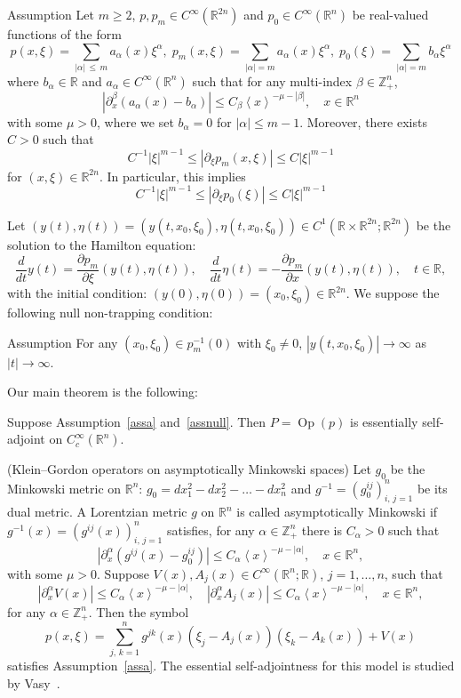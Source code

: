 \documentclass[AHL,Unicode,longabstracts,published]{cedram}
\renewcommand*\a{\alpha}
\renewcommand*\b{\beta}
\newcommand*\m{\mu}
\newcommand*\x{\xi}
\newcommand*\y{\eta}
\DeclareMathOperator{\Op}{Op}
\newcommand*\re{\mathbb{R}}
\newcommand*\ze{\mathbb{Z}}
\newcommand*\pa{\partial}
\newcommand{\jap}[1]{\left\langle #1 \right\rangle}
\begin{document}
\begin{enonce}[plain]{Assumption}\label{assa}
Let $m\geq 2$, $p, p_m\in C^{\infty}(\re^{2n})$ and $p_0\in C^{\infty}(\re^n)$ be real-valued functions of the form
\[
p(x,\x)=\sum_{|\a|\,\leq\,m}a_{\a}(x)\x^{\a},\; p_m(x,\x)=\sum_{|\a|=m}a_{\a}(x)\x^{\a},\; p_0(\x)=\sum_{|\a|=m}b_{\a}\x^{\a}
\]
where $b_{\a}\in \re$ and $a_{\a}\in C^{\infty}(\re^n)$ such that for any multi-index $\b\in\ze_+^n$,
\[
\left|\pa_{x}^{\b}(a_{\a}(x)-b_{\a})\right|\leq C_{\b}\jap{x}^{-\m-|\b|}, \quad x\in\re^n
\]
with some $\m>0$, where we set $b_{\a}=0$ for $|\a|\leq m-1$. Moreover, there exists $C>0$ such that
\[
C^{-1}|\x|^{m-1}\leq \left|\pa_{\x}p_m(x,\x)\right|\leq C|\x|^{m-1}
\]
for $(x,\x)\in \re^{2n}$. In particular, this implies
\[
C^{-1}|\x|^{m-1}\leq\left|\pa_{\x}p_0(\x)\right|\leq C|\x|^{m-1}
\]
\end{enonce}

Let $(y(t), \y(t))=(y(t, x_0, \x_0),\y(t, x_0, \x_0))\in C^1(\re\times\re^{2n};\re^{2n})$ be the solution to the Hamilton equation:
\[
\frac{d}{dt} y(t) =\frac{\pa p_m}{\pa \x}(y(t),\y(t)), \quad
\frac{d}{dt} \y(t) =-\frac{\pa p_m}{\pa x}(y(t),\y(t)), \quad t\in\re,
\]
with the initial condition: $(y(0),\y(0))=(x_0,\x_0)\in\re^{2n}$. We suppose the following null non-trapping condition:

\begin{enonce}[plain]{Assumption}\label{assnull}
For any $(x_0, \x_0)\in p_m^{-1}(0)$ with $\x_0\neq 0$, $| y(t, x_0, \x_0) | \to \infty$ as $|t|\to \infty$.
\end{enonce}

Our main theorem is the following:

\begin{theo}\label{nullthm}
Suppose Assumption~\ref{assa} and~\ref{assnull}. Then $P=\Op(p)$ is essentially self-adjoint on $C_c^\infty(\re^n)$.
\end{theo}

\begin{rema}\label{basicexample}
(Klein--Gordon operators on asymptotically Minkowski spaces) Let $g_0$ be the Minkowski metric on $\re^n$: $g_0=dx_1^2-dx_2^2-\dots-dx_n^2$ and $g^{-1}=(g^{ij}_0)_{i,\,j=1}^n$ be its dual metric. A Lorentzian metric $g$ on $\re^n$ is called asymptotically Minkowski if $g^{-1}(x)=(g^{ij}(x))_{i,\,j=1}^n$ satisfies, for any $\a\in\ze_+^n$ there is $C_\a>0$ such that
\[
\left|\pa_{x}^{\a}\left(g^{ij}(x)- g_0^{ij}\right)\right|\leq C_{\a}\jap{x}^{-\m-|\a|},\quad x\in\re^n,
\]
with some $\m>0$. Suppose $V(x), A_j(x)\in C^\infty(\re^n;\re)$, $j=1,\dots, n$, such that
\[
\left|\pa_{x}^{\a}V(x)\right|\leq C_{\a}\jap{x}^{-\m-|\a|}, \quad \left|\pa_{x}^{\a}A_j(x)\right|\leq C_{\a}\jap{x}^{-\m-|\a|},
\quad x\in\re^n,
\]
for any $\a\in\ze_+^n$. Then the symbol
\[
p(x,\x)=\sum_{j,\,k=1}^ng^{jk}(x)\left(\x_j-A_j(x)\right)\left(\x_k-A_k(x)\right) +V(x)
\]
satisfies Assumption~\ref{assa}. The essential self-adjointness for this model is studied by Vasy~\cite{Va1}.
\end{rema}
\end{document}
